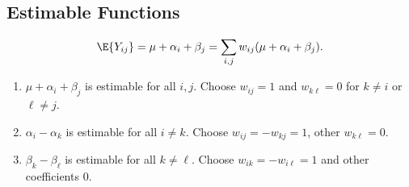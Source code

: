 \subsection*{Estimable Functions}
\[ \E{Y_{ij}}=\mu+\alpha_i+\beta_j =\sum_{i,j}w_{ij}(\mu+\alpha_i+\beta_j). \]
\begin{enumerate}[(1)]
    \item $ \mu+\alpha_i+\beta_j $ is estimable for all $ i,j $. Choose $ w_{ij}=1 $ and $ w_{k\ell}=0 $ for $ k\ne i $ or $ \ell\ne j $.
    \item $ \alpha_i-\alpha_k $ is estimable for all $ i\ne k $. Choose $ w_{ij}=-w_{kj}=1 $, other $ w_{k\ell}=0 $.
    \item $ \beta_k-\beta_\ell $ is estimable for all $ k\ne \ell $. Choose $ w_{ik}=-w_{i\ell}=1 $ and other coefficients $ 0 $.
\end{enumerate}
